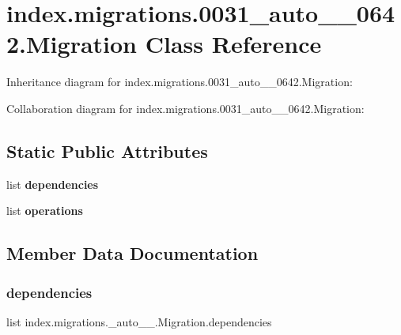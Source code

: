 \hypertarget{classindex_1_1migrations_1_10031__auto__20171029__0642_1_1Migration}{}\section{index.\+migrations.0031\+\_\+auto\+\_\+\_\+0642.Migration Class Reference}
\label{classindex_1_1migrations_1_10031__auto__20171029__0642_1_1Migration}


Inheritance diagram for index.\+migrations.0031\+\_\+auto\+\_\+\_\+0642.Migration\+:


Collaboration diagram for index.\+migrations.0031\+\_\+auto\+\_\+\_\+0642.Migration\+:
\subsection*{Static Public Attributes}
\begin{DoxyCompactItemize}
\item 
list {\bfseries dependencies}
\item 
\mbox{\label{classindex_1_1migrations_1_10031__auto__20171029__0642_1_1Migration_afef0a3ab36e2e5975ed1998ba4e287c5}} 
list {\bfseries operations}
\end{DoxyCompactItemize}


\subsection{Member Data Documentation}
\mbox{\label{classindex_1_1migrations_1_10031__auto__20171029__0642_1_1Migration_a3a13349847802fec89f9daa48a5e9bd2}} 
\subsubsection{\texorpdfstring{dependencies}{dependencies}}
{\footnotesize\ttfamily list index.\+migrations.\+\_\+auto\+\_\+\_.\+Migration.\+dependencies\hspace{0.3cm}{\ttfamily [static]}}


